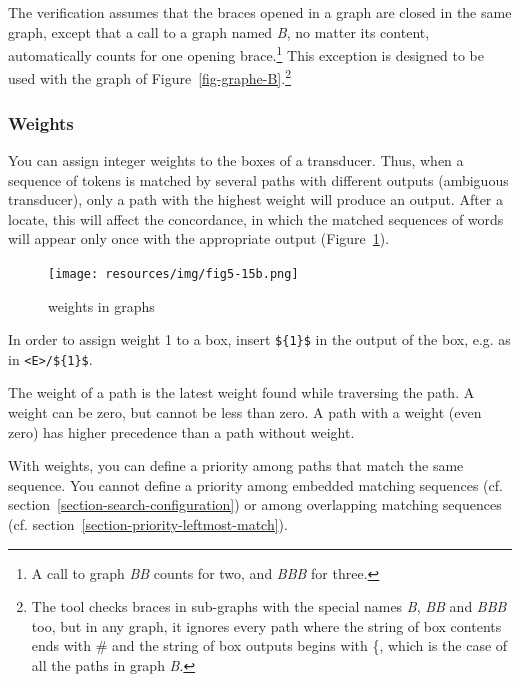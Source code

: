 \bigskip
\noindent The verification assumes that the braces opened in a graph are closed in the
same graph, except that a call to a graph named \textit{B}, no matter its content,
automatically counts for one opening brace.\footnote{ A call to graph \textit{BB} counts
for two, and \textit{BBB} for three.} This exception is designed to be used with the
graph of  Figure~\ref{fig-graphe-B}.\footnote{ The tool checks braces in sub-graphs
with the  special  names \textit{B}, \textit{BB} and \textit{BBB} too, but in any graph,
it ignores every path where the string of box contents ends with \# and the string of
box outputs begins with \{, which is the case of all the paths in graph \textit{B}.}


\subsubsection{Weights}
You can assign integer weights to the boxes of a transducer.
Thus, when a sequence of tokens is matched by several paths with different outputs 
(ambiguous transducer), only a path with the highest weight will produce an output. 
After a locate, this will affect the concordance, in which 
the matched sequences of words will appear only once with the appropriate output
(Figure~\ref{fig-weights-in-graphs}).

\begin{figure}[!ht]
\begin{center}
\texttt{[image: resources/img/fig5-15b.png]}
\caption{weights in graphs \label{fig-weights-in-graphs}}
\end{center}
\end{figure}

\bigskip
\noindent In order to assign weight 1 to a box, insert \verb+${1}$+
in the output of the box, e.g. as in \verb+<E>/${1}$+.

\bigskip
\noindent The weight of a path is the latest weight found while traversing the path. A weight can be zero, but cannot be less than zero. A path with a weight (even zero) has higher precedence than a path without weight.

\bigskip
\noindent With weights, you can define a priority among paths that match the same sequence.
You cannot define a priority among embedded matching sequences (cf. section~\ref{section-search-configuration})
 or among overlapping matching sequences (cf. section~\ref{section-priority-leftmost-match}).
 
